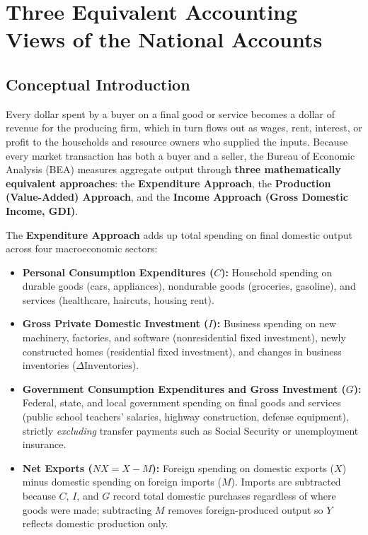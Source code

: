 \documentclass[11pt,letterpaper]{article}
\begin{document}
\section{Three Equivalent Accounting Views of the National Accounts}

\subsection*{Conceptual Introduction}
Every dollar spent by a buyer on a final good or service becomes a dollar of revenue for the producing firm, which in turn flows out as wages, rent, interest, or profit to the households and resource owners who supplied the inputs. Because every market transaction has both a buyer and a seller, the Bureau of Economic Analysis (BEA) measures aggregate output through \textbf{three mathematically equivalent approaches}: the \textbf{Expenditure Approach}, the \textbf{Production (Value-Added) Approach}, and the \textbf{Income Approach (Gross Domestic Income, GDI)}.

The \textbf{Expenditure Approach} adds up total spending on final domestic output across four macroeconomic sectors:
\begin{itemize}
    \item \textbf{Personal Consumption Expenditures ($C$):} Household spending on durable goods (cars, appliances), nondurable goods (groceries, gasoline), and services (healthcare, haircuts, housing rent).
    \item \textbf{Gross Private Domestic Investment ($I$):} Business spending on new machinery, factories, and software (nonresidential fixed investment), newly constructed homes (residential fixed investment), and changes in business inventories ($\Delta \text{Inventories}$).
    \item \textbf{Government Consumption Expenditures and Gross Investment ($G$):} Federal, state, and local government spending on final goods and services (public school teachers' salaries, highway construction, defense equipment), strictly \emph{excluding} transfer payments such as Social Security or unemployment insurance.
    \item \textbf{Net Exports ($NX = X - M$):} Foreign spending on domestic exports ($X$) minus domestic spending on foreign imports ($M$). Imports are subtracted because $C$, $I$, and $G$ record total domestic purchases regardless of where goods were made; subtracting $M$ removes foreign-produced output so $Y$ reflects domestic production only.
\end{itemize}
\end{document}
